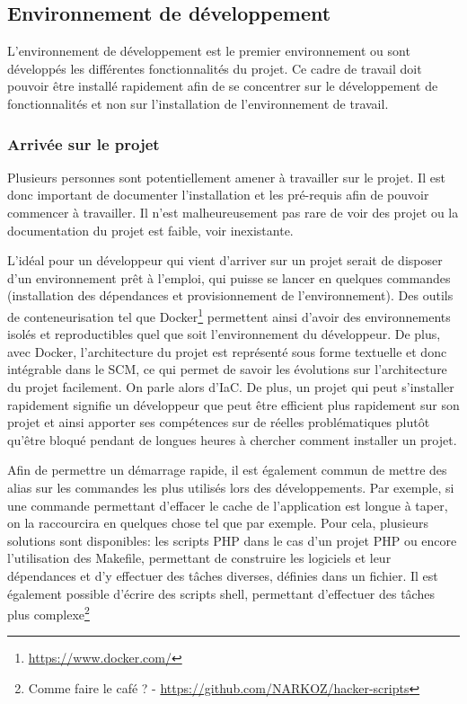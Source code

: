 
\subsection{Environnement de développement}

L'environnement de développement est le premier environnement ou sont développés les différentes fonctionnalités du projet. Ce cadre de travail doit pouvoir être installé rapidement afin de se concentrer sur le développement de fonctionnalités et non sur l'installation de l'environnement de travail.

\subsubsection{Arrivée sur le projet}

Plusieurs personnes sont potentiellement amener à travailler sur le projet. Il est donc important de documenter l'installation et les pré-requis afin de pouvoir commencer à travailler. Il n'est malheureusement pas rare de voir des projet ou la documentation du projet est faible, voir inexistante.

L'idéal pour un développeur qui vient d'arriver sur un projet serait de disposer d'un environnement prêt à l'emploi, qui puisse se lancer en quelques commandes (installation des dépendances et provisionnement de l'environnement). Des outils de conteneurisation tel que Docker\footnote{\url{https://www.docker.com/}} permettent ainsi d'avoir des environnements isolés et reproductibles quel que soit l'environnement du développeur. De plus, avec Docker, l'architecture du projet est représenté sous forme textuelle et donc intégrable dans le \gls{SCM}, ce qui permet de savoir les évolutions sur l'architecture du projet facilement. On parle alors d'\gls{IaC}. De plus, un projet qui peut s'installer rapidement signifie un développeur que peut être efficient plus rapidement sur son projet et ainsi apporter ses compétences sur de réelles problématiques plutôt qu'être bloqué pendant de longues heures à chercher comment installer un projet.

Afin de permettre un démarrage rapide, il est également commun de mettre des alias sur les commandes les plus utilisés lors des développements. Par exemple, si une commande permettant d'effacer le cache de l'application est longue à taper, on la raccourcira en quelques chose tel que  par exemple. Pour cela, plusieurs solutions sont disponibles: les scripts \gls{PHP} dans le cas d'un projet \gls{PHP} ou encore l'utilisation des Makefile, permettant de construire les logiciels et leur dépendances et d'y effectuer des tâches diverses, définies dans un fichier. Il est également possible d'écrire des scripts shell, permettant d'effectuer des tâches plus complexe\footnote{Comme faire le café ?  - \url{https://github.com/NARKOZ/hacker-scripts}}

